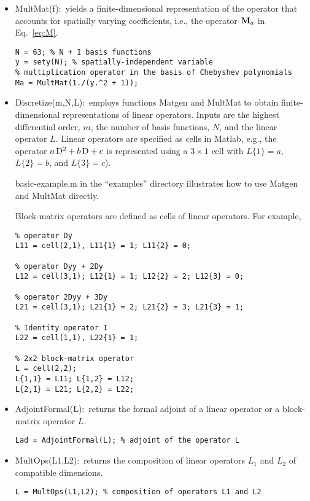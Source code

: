 \documentclass[%
secnumarabic,%
 amssymb, amsmath,%
 aps,prf,superscriptaddress,longbibliography
frontmatterverbose,
]{revtex4-2}
\begin{document}
\begin{itemize}
   \item \textsf{MultMat(f)}:~yields a finite-dimensional representation of the operator that accounts for spatially varying coefficients, i.e., the operator $\mathbf{M}_a$ in Eq.~\eqref{eq:M}.
\begin{lstlisting}
N = 63; % N + 1 basis functions
y = sety(N); % spatially-independent variable
% multiplication operator in the basis of Chebyshev polynomials
Ma = MultMat(1./(y.^2 + 1));
\end{lstlisting}

  \item \textsf{Discretize(m,N,L)}:~employs functions \textsf{Matgen} and \textsf{MultMat} to obtain finite-dimensional representations of linear operators. Inputs are the highest differential order, $m$, the number of basis functions, $N$, and the linear operator $L$. Linear operators are specified as cells in Matlab, e.g., the operator $a\,\mathrm D^2 + b\,\mathrm D + c$ is represented using a $3\times 1$ cell with $L\{1\} = a$, $L\{2\} = b$, and $L\{3\} = c$). 
  
	\vspace*{0.1cm}  
{\sf basic-example.m} in the ``examples'' directory illustrates how to use \textsf{Matgen} and \textsf{MultMat} directly.
 
 	\vspace*{0.1cm}  
Block-matrix operators are defined as cells of linear operators. For example, 
\begin{lstlisting}
% operator Dy
L11 = cell(2,1), L11{1} = 1; L11{2} = 0;

% operator Dyy + 2Dy
L12 = cell(3,1); L12{1} = 1; L12{2} = 2; L12{3} = 0;

% operator 2Dyy + 3Dy
L21 = cell(3,1); L21{1} = 2; L21{2} = 3; L21{3} = 1;

% Identity operator I
L22 = cell(1,1), L22{1} = 1;

% 2x2 block-matrix operator
L = cell(2,2);
L{1,1} = L11; L{1,2} = L12;
L{2,1} = L21; L{2,2} = L22;
\end{lstlisting}
  
\item {\sf AdjointFormal(L):}~returns the formal adjoint of a linear operator or a block-matrix operator $L$.
\begin{lstlisting}
Lad = AdjointFormal(L); % adjoint of the operator L
\end{lstlisting}
  
\item {\sf MultOps(L1,L2):}~returns the composition of linear operators $L_1$ and $L_2$ of compatible dimensions.
\begin{lstlisting}
L = MultOps(L1,L2); % composition of operators L1 and L2
\end{lstlisting}


\end{itemize}
\end{document}
